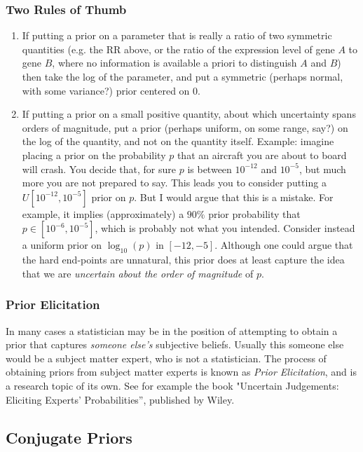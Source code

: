 \documentclass[12pt]{article}
\begin{document}
\subsubsection{Two Rules of Thumb}
\begin{enumerate}
\item If putting a prior on a parameter that is really a ratio of two symmetric quantities (e.g. the RR above, or the ratio
of the expression level of gene $A$ to gene $B$, where no information is available a priori to distinguish $A$ and $B$) then take the log of the parameter, and put a symmetric (perhaps normal, with some variance?) prior centered on 0.
\item If putting a prior on a small positive quantity, about which uncertainty spans orders of magnitude, put a prior (perhaps uniform, on some range, say?) on the log of the quantity, and not on the quantity itself. Example: imagine placing a prior on the probability $p$ that an aircraft you are about to board will crash. You decide that, for sure $p$ is between $10^{-12}$ and $10^{-5}$, but much more you are not prepared to say. This leads you 
to consider putting a $U[10^{-12},10^{-5}]$ prior on $p$.  But I would argue that this is a mistake. For example, it implies (approximately) a $90\%$ prior probability that $p \in [10^{-6}, 10^{-5}]$, 
which is probably not what you intended. Consider instead a uniform prior on $\log_{10}(p)$ in $[-12,-5]$. Although one could argue that the hard end-points are unnatural,
this prior does at least capture the idea that we are {\it uncertain about the order of magnitude} of $p$.
\end{enumerate}

\subsubsection{Prior Elicitation}

In many cases a statistician may be in the position of attempting to obtain a prior that
captures {\it someone else's} subjective beliefs. Usually this someone else would be a subject matter expert, who is not a statistician. The process of obtaining priors from subject
matter experts is known as {\it Prior Elicitation}, and is a research topic of its own.
See for example the book "Uncertain Judgements: Eliciting Experts' Probabilities'', published by Wiley.



\subsection{Conjugate Priors}
\end{document}

